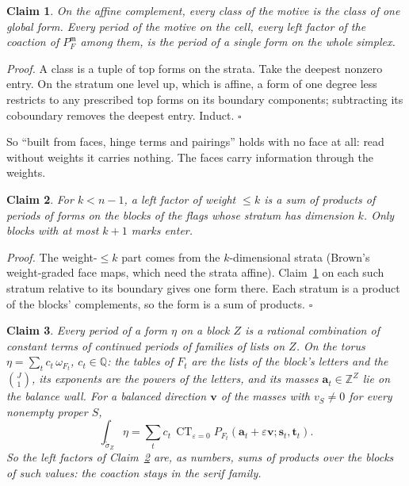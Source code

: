 \documentclass[11pt]{article}
\DeclareMathOperator*{\CT}{CT}
\theoremstyle{plain}
\newtheorem{claim}{Claim}[section]
\theoremstyle{remark}
\begin{document}
\begin{claim}\label{cl:oneform}
On the affine complement, every class of the motive is the class of one global form. Every period of the motive on the cell, every left factor of the coaction of $P_F^{\mathfrak m}$ among them, is the period of a single form on the whole simplex.
\end{claim}

\emph{Proof.} A class is a tuple of top forms on the strata. Take the deepest nonzero entry. On the stratum one level up, which is affine, a form of one degree less restricts to any prescribed top forms on its boundary components; subtracting its coboundary removes the deepest entry. Induct. $\square$

So ``built from faces, hinge terms and pairings'' holds with no face at all: read without weights it carries nothing. The faces carry information through the weights.

\begin{claim}\label{cl:weights}
For $k<n-1$, a left factor of weight $\le k$ is a sum of products of periods of forms on the blocks of the flags whose stratum has dimension $k$. Only blocks with at most $k+1$ marks enter.
\end{claim}

\emph{Proof.} The weight-$\le k$ part comes from the $k$-dimensional strata (Brown's weight-graded face maps, which need the strata affine). Claim~\ref{cl:oneform} on each such stratum relative to its boundary gives one form there. Each stratum is a product of the blocks' complements, so the form is a sum of products. $\square$

\begin{claim}\label{cl:serif14}
Every period of a form $\eta$ on a block $Z$ is a rational combination of constant terms of continued periods of families of lists on $Z$. On the torus $\eta=\sum_tc_t\,\omega_{F_t}$, $c_t\in\mathbb Q$: the tables of $F_t$ are the lists of the block's letters and the $\binom J1$, its exponents are the powers of the letters, and its masses $\mathbf a_t\in\mathbb Z^Z$ lie on the balance wall. For a balanced direction $\mathbf v$ of the masses with $v_S\neq0$ for every nonempty proper $S$,
\[
\int_{\widetilde\sigma_Z}\eta=\sum_tc_t\,\CT_{\varepsilon=0}P_{F_t}(\mathbf a_t+\varepsilon\mathbf v;\mathbf s_t,\mathbf t_t).
\]
So the left factors of Claim~\ref{cl:weights} are, as numbers, sums of products over the blocks of such values: the coaction stays in the serif family.
\end{claim}
\end{document}
